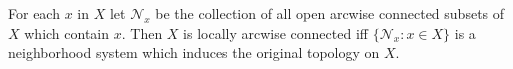 For each $x$ in $X$ let $\mathcal{N}_x$ be the collection of all open arcwise connected subsets of $X$ which contain $x$. Then $X$ is locally arcwise connected iff $\{\mathcal{N}_x : x \in X\}$ is a neighborhood system which induces the original topology on $X$.

